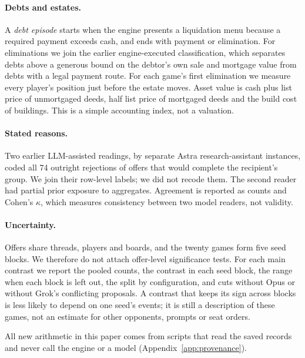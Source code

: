\paragraph{Debts and estates.} A \emph{debt episode} starts when the engine presents a liquidation menu because a required payment exceeds cash, and ends with payment or elimination. For eliminations we join the earlier engine-executed classification, which separates debts above a generous bound on the debtor's own sale and mortgage value from debts with a legal payment route. For each game's first elimination we measure every player's position just before the estate moves. Asset value is cash plus list price of unmortgaged deeds, half list price of mortgaged deeds and the build cost of buildings. This is a simple accounting index, not a valuation.

\paragraph{Stated reasons.} Two earlier LLM-assisted readings, by separate Astra research-assistant instances, coded all 74 outright rejections of offers that would complete the recipient's group. We join their row-level labels; we did not recode them. The second reader had partial prior exposure to aggregates. Agreement is reported as counts and Cohen's $\kappa$, which measures consistency between two model readers, not validity.

\paragraph{Uncertainty.} Offers share threads, players and boards, and the twenty games form five seed blocks. We therefore do not attach offer-level significance tests. For each main contrast we report the pooled counts, the contrast in each seed block, the range when each block is left out, the split by configuration, and cuts without Opus or without Grok's conflicting proposals. A contrast that keeps its sign across blocks is less likely to depend on one seed's events; it is still a description of these games, not an estimate for other opponents, prompts or seat orders.

All new arithmetic in this paper comes from scripts that read the saved records and never call the engine or a model (Appendix~\ref{app:provenance}).
